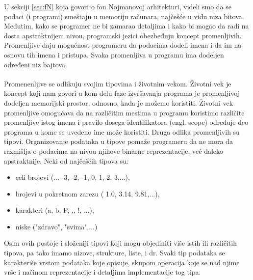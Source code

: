 \documentclass[a4paper]{article}
\begin{document}
U sekciji \ref{sec:fN} koja govori o fon Nojmanovoj arhitekturi, videli smo da se podaci (i programi) smeštaju u memoriju računara, najčešće u vidu niza bitova. Međutim, kako se programer ne bi zamarao detaljima i kako bi mogao da radi na dosta apstraktnijem nivou, programski jezici obezbeđuju koncept promenljivih. Promenljive daju mogućnost programeru da podacima dodeli imena i da im na osnovu tih imena i pristupa. Svaka promenljiva u programu ima dodeljen određeni niz bajtova. \\\\
Promenenljive se odlikuju svojim tipovima i životnim vekom. Životni vek je koncept koji nam govori u kom delu faze izvršavanja programa je promenljivoj dodeljen memorijski prostor, odnosno, kada je možemo koristiti. Životni vek promenljive omogućava da na različitim mestima u programu koristimo različite promenljive istog imena i pravilo dosega identifikatora (engl. scope) određuje deo programa u kome se uvedeno ime može koristiti. Druga odlika promenljivih su tipovi. Organizovanje podataka u tipove pomaže programeru da ne mora da razmišlja o podacima na nivou njihove binarne reprezentacije, već daleko apstraktnije. Neki od najčešćih tipova su:
\begin{itemize}
\item celi brojevi (... -3, -2, -1, 0, 1, 2, 3,...),
\item brojevi u pokretnom zarezu ( 1.0, 3.14, 9.81,...),
\item karakteri (a, b, P, ,, !, ...),
\item niske ("zdravo", "svima",...)
\end{itemize} 
Osim ovih postoje i složeniji tipovi koji mogu objediniti više istih ili različitih tipova, pa tako imamo nizove, strukture, liste, i dr.
Svaki tip podataka se karakteriše vrstom podataka koje opisuje, skupom operacija koje se nad njime vrše i načinom reprezentacije i detaljima implementacije tog tipa.
\end{document}

